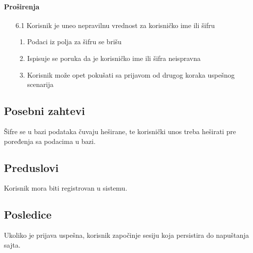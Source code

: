 \documentclass[a4paper,12pt]{report}
\begin{document}
			\paragraph*{Proširenja}
				\begin{enumerate}
					\item[6.1] Korisnik je uneo nepravilnu vrednost za korisničko ime ili šifru
						\begin{enumerate}[noitemsep,topsep=-8pt]
							\item Podaci iz polja za šifru se brišu
							\item Ispisuje se poruka da je korisničko ime ili šifra neispravna
							\item Korisnik može opet pokušati sa prijavom od drugog koraka uspešnog scenarija
						\end{enumerate}
				\end{enumerate}
		\subsection{Posebni zahtevi}
			Šifre se u bazi podataka čuvaju heširane, te korisnički unos treba heširati pre poređenja sa podacima u bazi.
		\subsection{Preduslovi}
			Korisnik mora biti registrovan u sistemu.
		\subsection{Posledice}
			Ukoliko je prijava uspešna, korisnik započinje sesiju koja persistira do napuštanja sajta.
\end{document}
